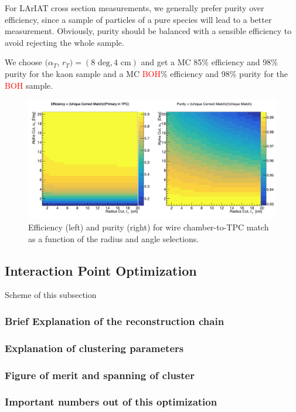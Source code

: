 For LArIAT cross section measurements, we generally prefer purity over efficiency, since a sample of particles of a pure species will lead to a better measurement. Obviously, purity should be balanced with a sensible efficiency to avoid rejecting the whole sample. 

We choose $(\alpha_{T}$, $r_{T}) = (8 \text{ deg}, 4 \text{ cm} )$ and get a MC 85\% efficiency and 98\% purity for the kaon sample and a MC \textcolor{red}{BOH}\% efficiency and 98\% purity for the \textcolor{red}{BOH} sample.


\begin{figure}[hpbt]
\centering
\includegraphics[width=15cm]{Chapter-5/Images/KEffPurity.png}
\caption{Efficiency (left) and purity (right) for wire chamber-to-TPC match as a function of the radius and angle selections.}
\label{fig:EffPurityK}
\end{figure}

\subsection{Interaction Point Optimization}\label{ch:TrackingOptimization}
Scheme of this subsection
\subsubsection{Brief Explanation of the reconstruction chain}
\subsubsection{Explanation of clustering parameters}
\subsubsection{Figure of merit and  spanning of cluster}
\subsubsection{Important numbers out of this optimization}


